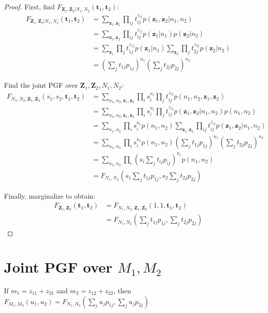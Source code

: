 \documentclass{article}
\begin{document}
\begin{proof}
First, find $F_{\mathbf{Z}_1, \mathbf{Z}_2|N_1, N_2}(\mathbf{t}_1, \mathbf{t}_2)$:
\begin{align*}
F_{\mathbf{Z}_1, \mathbf{Z}_2|N_1, N_2}(\mathbf{t}_1, \mathbf{t}_2)
&= \sum_{\mathbf{z}_1, \mathbf{z}_2} \prod_{ij} t_{ij}^{z_{ij}} p(\mathbf{z}_1, \mathbf{z}_2|n_1, n_2) \\
&= \sum_{\mathbf{z}_1, \mathbf{z}_2} \prod_{ij} t_{ij}^{z_{ij}} p(\mathbf{z}_1|n_1) p(\mathbf{z}_2|n_2) \\
&= \sum_{\mathbf{z}_1} \prod_{j} t_{1j}^{z_{1j}} p(\mathbf{z}_1|n_1) \sum_{\mathbf{z}_2} \prod_{j} t_{2j}^{z_{2j}} p(\mathbf{z}_2|n_2) \\
&= (\sum_j t_{1j} p_{1j})^{n_1} (\sum_j t_{2j} p_{2j})^{n_2}
\end{align*}

Find the joint PGF over $\mathbf{Z}_1, \mathbf{Z}_2, N_1, N_2$:
\begin{align*}
F_{N_1, N_2, \mathbf{Z}_1, \mathbf{Z}_2}(s_1, s_2, \mathbf{t}_1, \mathbf{t}_2)
&= \sum_{n_1, n_2, \mathbf{z}_1, \mathbf{z}_2} \prod_{i} s_i^{n_i} \prod_j t_{ij}^{z_{ij}} p(n_1, n_2, \mathbf{z}_1, \mathbf{z}_2) \\
&= \sum_{n_1, n_2, \mathbf{z}_1, \mathbf{z}_2} \prod_{i} s_i^{n_i} \prod_j t_{ij}^{z_{ij}} p(\mathbf{z}_1, \mathbf{z}_2|n_1, n_2) p(n_1, n_2) \\
&= \sum_{n_1, n_2} \prod_{i} s_i^{n_i} p(n_1, n_2) \sum_{\mathbf{z}_1, \mathbf{z}_2} \prod_{ij} t_{ij}^{z_{ij}} p(\mathbf{z}_1, \mathbf{z}_2|n_1, n_2) \\
&= \sum_{n_1, n_2} \prod_{i} s_i^{n_i} p(n_1, n_2) (\sum_j t_{1j} p_{1j})^{n_1} (\sum_j t_{2j} p_{2j})^{n_2} \\
&= \sum_{n_1, n_2} \prod_{i} (s_i\sum_j t_{ij} p_{ij})^{n_i} p(n_1, n_2) \\
&= F_{N_1, N_2}(s_1 \sum_j t_{1j} p_{1j}, s_2 \sum_j t_{2j} p_{2j})
\end{align*}

Finally, marginalize to obtain:
\begin{align*}
F_{\mathbf{Z}_1, \mathbf{Z}_2}(\mathbf{t}_1, \mathbf{t}_2)
&= F_{N_1, N_2, \mathbf{Z}_1, \mathbf{Z}_2}(1, 1, \mathbf{t}_1, \mathbf{t}_2) \\
&= F_{N_1, N_2}(\sum_j t_{1j} p_{1j}, \sum_j t_{2j} p_{2j})
\end{align*}

\end{proof}

\section{Joint PGF over $M_1, M_2$}
If $m_1 = z_{11} + z_{21}$ and $m_2 = z_{12} + z_{22}$, then $F_{M_1, M_2}(u_1, u_2) = F_{N_1, N_2}(\sum_j u_j p_{1j}, \sum_j u_j p_{2j})$
\end{document}
